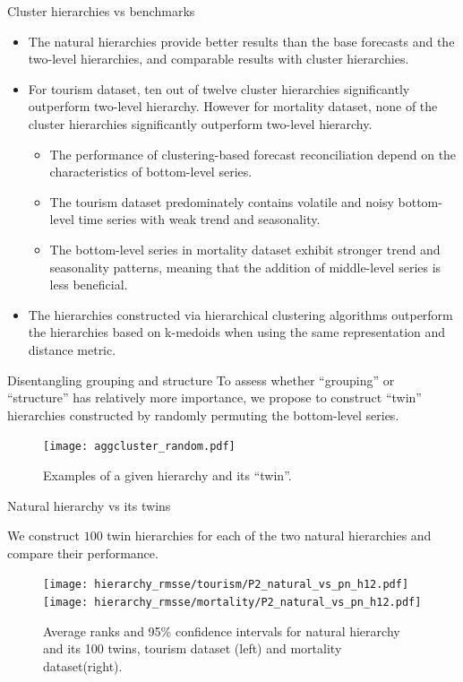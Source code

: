 \documentclass[aspectratio=169]{beamer}
\begin{document}
\begin{frame}{Cluster hierarchies vs benchmarks}

	\begin{itemize}
		\item The {\color{red} natural hierarchies} provide better results than the base forecasts and the two-level hierarchies, and {\color{red} comparable results with cluster hierarchies}.
		\item For tourism dataset, {\color{red} ten out of twelve} cluster hierarchies significantly outperform two-level hierarchy. However for mortality dataset, none of the cluster hierarchies significantly outperform two-level hierarchy.
		\begin{itemize}
			\item The performance of clustering-based forecast reconciliation depend on the characteristics of bottom-level series.
			\item The tourism dataset predominately contains {\color{red} volatile and noisy} bottom-level time series with weak trend and seasonality. 
			\item The bottom-level series in mortality dataset exhibit {\color{red} stronger trend and seasonality patterns}, meaning that the addition of middle-level series is less beneficial.
		\end{itemize}
		\item The hierarchies constructed via {\color{red} hierarchical clustering} algorithms outperform the hierarchies based on {\color{red} k-medoids }when using the same representation and distance metric.
	\end{itemize}
\end{frame}

\begin{frame}{Disentangling grouping and structure}
	To assess whether ``grouping'' or ``structure'' has relatively more importance, we propose to construct {\color{red}``twin'' hierarchies} constructed by {\color{red}randomly permuting the bottom-level series}.

	\begin{figure}
		\centering
		\texttt{[image: aggcluster\_random.pdf]}
		\caption{Examples of a given hierarchy and its “twin”.}
	\end{figure}
\end{frame}

\begin{frame}{Natural hierarchy vs its twins}

We construct $100$ twin hierarchies for each of the two natural hierarchies and compare their performance.

\begin{figure}
	\centering
	\texttt{[image: hierarchy\_rmsse/tourism/P2\_natural\_vs\_pn\_h12.pdf]}
	\texttt{[image: hierarchy\_rmsse/mortality/P2\_natural\_vs\_pn\_h12.pdf]}
	\caption{Average ranks and 95\% confidence intervals for natural hierarchy and its 100 twins, tourism dataset (left) and mortality dataset(right).}
\end{figure}
	
\end{frame}
\end{document}
